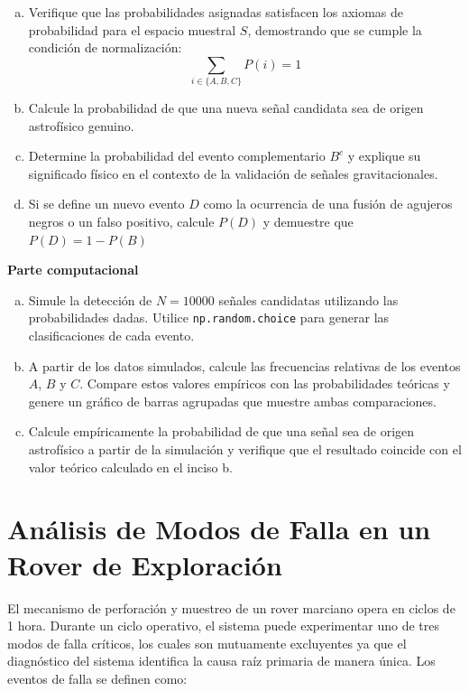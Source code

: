 \documentclass[a4paper]{article}
\begin{document}


\begin{enumerate}[a)]
\item Verifique que las probabilidades asignadas satisfacen los axiomas de probabilidad para el espacio muestral $S$, demostrando que se cumple la condición de normalización:
$$ \sum_{i \in \{A, B, C\}} P(i) = 1 $$
\item Calcule la probabilidad de que una nueva señal candidata sea de origen astrofísico genuino.
\item Determine la probabilidad del evento complementario $B^c$ y explique su significado físico en el contexto de la validación de señales gravitacionales.
\item Si se define un nuevo evento $D$ como la ocurrencia de una fusión de agujeros negros o un falso positivo, calcule $P(D)$ y demuestre que $P(D) = 1 - P(B)$
\end{enumerate}

\textbf{Parte computacional}
\begin{enumerate}[a)]
\item Simule la detección de $N = 10000$ señales candidatas utilizando las probabilidades dadas. Utilice \texttt{np.random.choice} para generar las clasificaciones de cada evento.
\item A partir de los datos simulados, calcule las frecuencias relativas de los eventos $A$, $B$ y $C$. Compare estos valores empíricos con las probabilidades teóricas y genere un gráfico de barras agrupadas que muestre ambas comparaciones.
\item Calcule empíricamente la probabilidad de que una señal sea de origen astrofísico a partir de la simulación y verifique que el resultado coincide con el valor teórico calculado en el inciso b.
\end{enumerate}

\section{Análisis de Modos de Falla en un Rover de Exploración}
\label{sec:problema-12}

El mecanismo de perforación y muestreo de un rover marciano opera en ciclos de 1 hora. Durante un ciclo operativo, el sistema puede experimentar uno de tres modos de falla críticos, los cuales son mutuamente excluyentes ya que el diagnóstico del sistema identifica la causa raíz primaria de manera única. Los eventos de falla se definen como:
\end{document}

